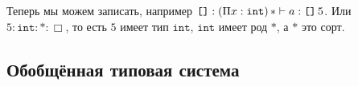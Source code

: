 Теперь мы можем записать, например
$\texttt{[]} : (\Pi x : \texttt{int}) \mathinner{*} \vdash a : \mathinner{\texttt{[]}} 5$.
Или $5 : \texttt{int} : * : \Box$, то есть $5$ имеет тип $\texttt{int}$, $\texttt{int}$ имеет род $*$, а $*$ это сорт.

\subsection{\texorpdfstring{Обобщённая типовая система}{Generalized type system}}
